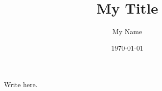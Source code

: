 \documentclass{article}
\title{My Title}
\author{My Name}
\date{\today}
\begin{document}
\maketitle

Write here.
\end{document}
